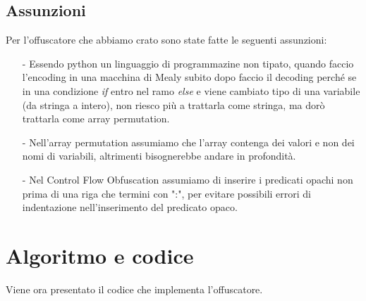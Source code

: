 \documentclass[a4paper,oneside,openright,titlepage,10pt,footinclude,headinclude]{scrbook}
\begin{document}
\subsection{Assunzioni}
Per l'offuscatore che abbiamo crato sono state fatte le seguenti assunzioni:
\begin{itemize}
\item[-] Essendo python un linguaggio di programmazine non tipato, quando faccio l'encoding in una macchina di Mealy subito dopo faccio il decoding perché se in una condizione \textit{if} entro nel ramo \textit{else} e viene cambiato tipo di una variabile (da stringa a intero), non riesco più a trattarla come stringa, ma dorò trattarla come array permutation.
\item[-] Nell'array permutation assumiamo che l'array contenga dei valori e non dei nomi di variabili, altrimenti bisognerebbe andare in profondità.
\item[-] Nel Control Flow Obfuscation assumiamo di inserire i predicati opachi non prima di una riga che termini con ":", per evitare possibili errori di indentazione nell'inserimento del predicato opaco.
\end{itemize}   

\section{Algoritmo e codice}\label{offuscatore_algo}
Viene ora presentato il codice che implementa l'offuscatore.\medskip
\end{document}
